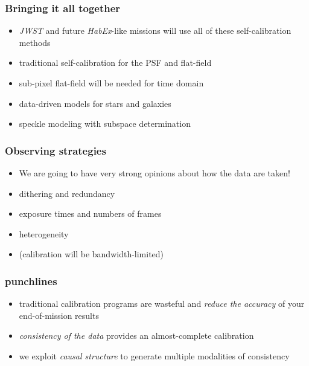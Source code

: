 \documentclass[pdftex]{beamer}
\newcommand{\conclusionslide}{
\begin{frame}
  \frametitle{punchlines}
  \begin{itemize}
  \item traditional calibration programs are wasteful and \emph{reduce the accuracy} of your end-of-mission results
  \item \emph{consistency of the data} provides an almost-complete calibration
  \item we exploit \emph{causal structure} to generate multiple modalities of consistency
  \end{itemize}
\end{frame}
}
\begin{document}
\begin{frame}
  \frametitle{Bringing it all together}
  \begin{itemize}
  \item \textsl{JWST} and future \textsl{HabEx}-like missions will use all of these self-calibration methods
  \item traditional self-calibration for the PSF and flat-field
  \item sub-pixel flat-field will be needed for time domain
  \item data-driven models for stars and galaxies
  \item speckle modeling with subspace determination
  \end{itemize}
\end{frame}

\begin{frame}
  \frametitle{Observing strategies}
  \begin{itemize}
  \item We are going to have very strong opinions about how the data are taken!
  \item dithering and redundancy
  \item exposure times and numbers of frames
  \item heterogeneity
  \item (calibration will be bandwidth-limited)
  \end{itemize}
\end{frame}

\conclusionslide
\end{document}
